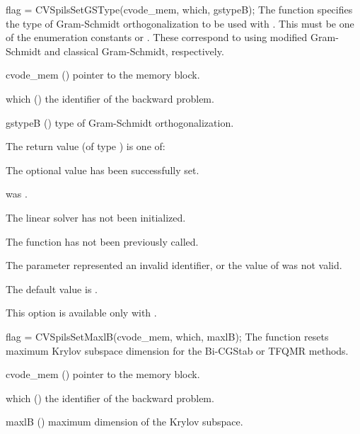 {
  flag = CVSpilsSetGSType(cvode\_mem, which, gstypeB);
}
{
  The function  specifies the type of
  Gram-Schmidt orthogonalization to be used with {\cvspgmr}.
  This must be one of the enumeration constants 
  or . These correspond to using modified Gram-Schmidt 
  and classical Gram-Schmidt, respectively. 
}
{
  \begin{args}[gstypeB]
  \item[cvode\_mem] ()
    pointer to the {\cvodes} memory block.
  \item[which] ()
    the identifier of the backward problem.
  \item[gstypeB] ()
    type of Gram-Schmidt orthogonalization.
  \end{args}
}
{
  The return value  (of type ) is one of:
  \begin{args}
  \item[\Id{CVSPILS\_SUCCESS}] 
    The optional value has been successfully set.
  \item[\Id{CVSPILS\_MEM\_NULL}]
     was .
  \item[\Id{CVSPILS\_LMEM\_NULL}]
    The {\cvspils} linear solver has not been initialized.
  \item[\Id{CVSPILS\_NO\_ADJ}]
    The function  has not been previously called.
  \item[\Id{CVSPILS\_ILL\_INPUT}]
    The parameter  represented an invalid identifier, or the 
    value of  was not valid.
  \end{args}
}
{
  The default value is .

  {\warn}This option is available only with {\cvspgmr}.
}
{
  flag = CVSpilsSetMaxlB(cvode\_mem, which, maxlB);
}
{
  The function  resets maximum Krylov subspace
  dimension for the Bi-CGStab or TFQMR 
  methods.
}
{
  \begin{args}
  \item[cvode\_mem] ()
    pointer to the {\cvodes} memory block.
  \item[which] ()
    the identifier of the backward problem.
  \item[maxlB] ()
    maximum dimension of the Krylov subspace.
  \end{args}
}
